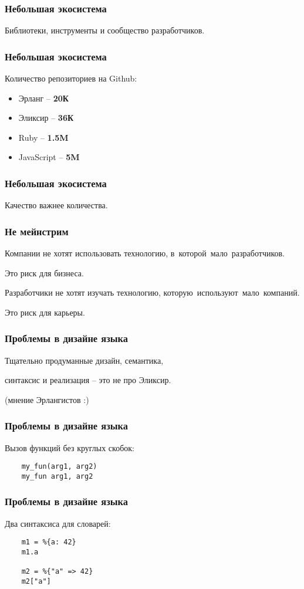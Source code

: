 \documentclass[10pt,xcolor=x11names]{beamer}
\begin{document}
\begin{frame}
  \frametitle{Небольшая экосистема}
  Библиотеки, инструменты и сообщество разработчиков.
\end{frame}

\begin{frame}
  \frametitle{Небольшая экосистема}
  Количество репозиториев на Github:
  \begin{itemize}
  \item Эрланг -- \textbf{20К}
  \item Эликсир -- \textbf{36К}
  \item Ruby -- \textbf{1.5M}
  \item JavaScript -- \textbf{5M}
  \end{itemize}
\end{frame}

\begin{frame}
  \frametitle{Небольшая экосистема}
  Качество важнее количества.
\end{frame}

\begin{frame}
  \frametitle{Не мейнстрим}
  Компании не хотят использовать технологию, в~которой~мало~разработчиков.
  \par \bigskip
  Это риск для бизнеса.
  \par \bigskip
  Разработчики не хотят изучать технологию, которую~используют~мало~компаний.
  \par \bigskip
  Это риск для карьеры.
\end{frame}

\begin{frame}
  \frametitle{Проблемы в дизайне языка}
  Тщательно продуманные дизайн, семантика,
  \par \bigskip
  синтаксис и реализация -- это не про Эликсир.
  \par \bigskip
  (мнение Эрлангистов :)
\end{frame}

\begin{frame}[fragile]
  \frametitle{Проблемы в дизайне языка}
  Вызов функций без круглых скобок:
  \begin{lstlisting}
    my_fun(arg1, arg2)
    my_fun arg1, arg2
  \end{lstlisting}
\end{frame}

\begin{frame}[fragile]
  \frametitle{Проблемы в дизайне языка}
  Два синтаксиса для словарей:
  \begin{lstlisting}
    m1 = %{a: 42}
    m1.a

    m2 = %{"a" => 42}
    m2["a"]
  \end{lstlisting}
\end{frame}
\end{document}
